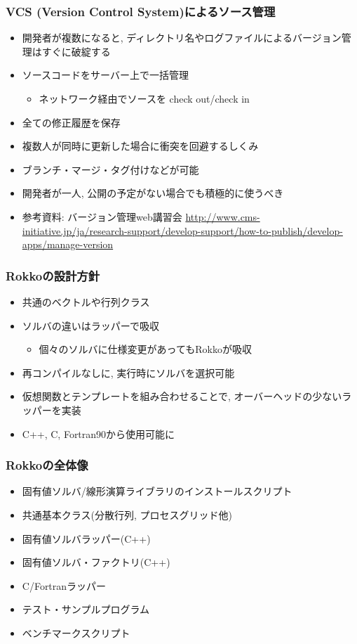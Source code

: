 \begin{frame}
  \frametitle{VCS (Version Control System)によるソース管理}
  \begin{itemize}
  \item 開発者が複数になると, ディレクトリ名やログファイルによるバージョン管理はすぐに破綻する
  \item ソースコードをサーバー上で一括管理
    \begin{itemize}
    \item ネットワーク経由でソースを check out/check in
    \end{itemize}
  \item 全ての修正履歴を保存
  \item 複数人が同時に更新した場合に衝突を回避するしくみ
  \item ブランチ・マージ・タグ付けなどが可能
  \item 開発者が一人, 公開の予定がない場合でも積極的に使うべき
  \item 参考資料: バージョン管理web講習会 {\tiny \url{http://www.cms-initiative.jp/ja/research-support/develop-support/how-to-publish/develop-apps/manage-version}}
  \end{itemize}
\end{frame}

\begin{frame}
  \frametitle{Rokkoの設計方針}
  \begin{itemize}
    \setlength{\itemsep}{1em}
  \item 共通のベクトルや行列クラス
  \item ソルバの違いはラッパーで吸収
    \begin{itemize}
    \item 個々のソルバに仕様変更があってもRokkoが吸収
    \end{itemize}
  \item 再コンパイルなしに, 実行時にソルバを選択可能
  \item 仮想関数とテンプレートを組み合わせることで, オーバーヘッドの少ないラッパーを実装
  \item C++, C, Fortran90から使用可能に
  \end{itemize}
\end{frame}

\begin{frame}
  \frametitle{Rokkoの全体像}
  \begin{itemize}
  \item 固有値ソルバ/線形演算ライブラリのインストールスクリプト
  \item 共通基本クラス(分散行列, プロセスグリッド他)
  \item 固有値ソルバラッパー(C++)
  \item 固有値ソルバ・ファクトリ(C++)
  \item C/Fortranラッパー
  \item テスト・サンプルプログラム
  \item ベンチマークスクリプト
  \end{itemize}
\end{frame}

